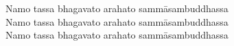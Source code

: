 \cleartorecto
\thispagestyle{empty}

\mbox{}\vfill

{\centering\itshape

Namo tassa bhagavato arahato sammāsambuddhassa\\
Namo tassa bhagavato arahato sammāsambuddhassa\\
Namo tassa bhagavato arahato sammāsambuddhassa

}

\vfill\mbox{}

\vspace*{5\baselineskip}

